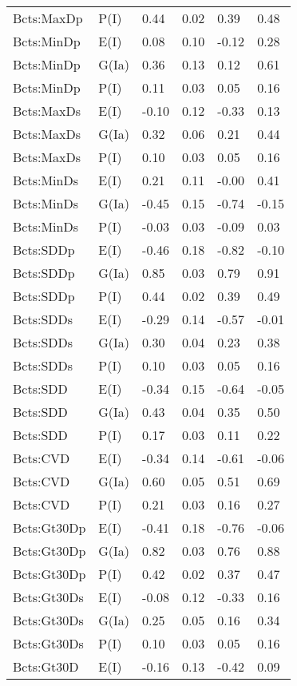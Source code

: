 \begin{center}
\begin{longtable}{|p{1.1in}|p{0.7in}|p{0.7in}|p{0.6in}|p{0.6in}|p{0.6in}|}
  Bcts:MaxDp & P(I) & 0.44 & 0.02 & 0.39 & 0.48 \\ 
  Bcts:MinDp & E(I) & 0.08 & 0.10 & -0.12 & 0.28 \\ 
  Bcts:MinDp & G(Ia) & 0.36 & 0.13 & 0.12 & 0.61 \\ 
  Bcts:MinDp & P(I) & 0.11 & 0.03 & 0.05 & 0.16 \\ 
  Bcts:MaxDs & E(I) & -0.10 & 0.12 & -0.33 & 0.13 \\ 
  Bcts:MaxDs & G(Ia) & 0.32 & 0.06 & 0.21 & 0.44 \\ 
  Bcts:MaxDs & P(I) & 0.10 & 0.03 & 0.05 & 0.16 \\ 
  Bcts:MinDs & E(I) & 0.21 & 0.11 & -0.00 & 0.41 \\ 
  Bcts:MinDs & G(Ia) & -0.45 & 0.15 & -0.74 & -0.15 \\ 
  Bcts:MinDs & P(I) & -0.03 & 0.03 & -0.09 & 0.03 \\ 
  Bcts:SDDp & E(I) & -0.46 & 0.18 & -0.82 & -0.10 \\ 
  Bcts:SDDp & G(Ia) & 0.85 & 0.03 & 0.79 & 0.91 \\ 
  Bcts:SDDp & P(I) & 0.44 & 0.02 & 0.39 & 0.49 \\ 
  Bcts:SDDs & E(I) & -0.29 & 0.14 & -0.57 & -0.01 \\ 
  Bcts:SDDs & G(Ia) & 0.30 & 0.04 & 0.23 & 0.38 \\ 
  Bcts:SDDs & P(I) & 0.10 & 0.03 & 0.05 & 0.16 \\ 
  Bcts:SDD & E(I) & -0.34 & 0.15 & -0.64 & -0.05 \\ 
  Bcts:SDD & G(Ia) & 0.43 & 0.04 & 0.35 & 0.50 \\ 
  Bcts:SDD & P(I) & 0.17 & 0.03 & 0.11 & 0.22 \\ 
  Bcts:CVD & E(I) & -0.34 & 0.14 & -0.61 & -0.06 \\ 
  Bcts:CVD & G(Ia) & 0.60 & 0.05 & 0.51 & 0.69 \\ 
  Bcts:CVD & P(I) & 0.21 & 0.03 & 0.16 & 0.27 \\ 
  Bcts:Gt30Dp & E(I) & -0.41 & 0.18 & -0.76 & -0.06 \\ 
  Bcts:Gt30Dp & G(Ia) & 0.82 & 0.03 & 0.76 & 0.88 \\ 
  Bcts:Gt30Dp & P(I) & 0.42 & 0.02 & 0.37 & 0.47 \\ 
  Bcts:Gt30Ds & E(I) & -0.08 & 0.12 & -0.33 & 0.16 \\ 
  Bcts:Gt30Ds & G(Ia) & 0.25 & 0.05 & 0.16 & 0.34 \\ 
  Bcts:Gt30Ds & P(I) & 0.10 & 0.03 & 0.05 & 0.16 \\ 
  Bcts:Gt30D & E(I) & -0.16 & 0.13 & -0.42 & 0.09 \\ 

\end{longtable}
\end{center}
